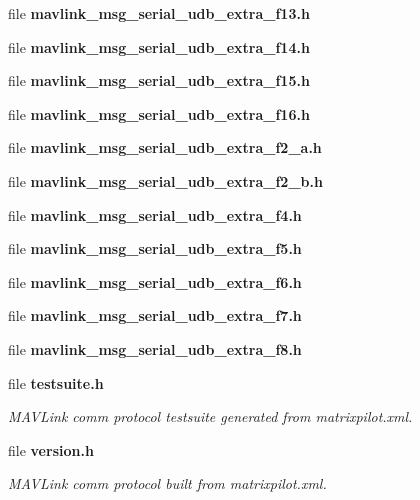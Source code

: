 \begin{DoxyCompactItemize}
file \textbf{ mavlink\+\_\+msg\+\_\+serial\+\_\+udb\+\_\+extra\+\_\+f13.\+h}
\item 
file \textbf{ mavlink\+\_\+msg\+\_\+serial\+\_\+udb\+\_\+extra\+\_\+f14.\+h}
\item 
file \textbf{ mavlink\+\_\+msg\+\_\+serial\+\_\+udb\+\_\+extra\+\_\+f15.\+h}
\item 
file \textbf{ mavlink\+\_\+msg\+\_\+serial\+\_\+udb\+\_\+extra\+\_\+f16.\+h}
\item 
file \textbf{ mavlink\+\_\+msg\+\_\+serial\+\_\+udb\+\_\+extra\+\_\+f2\+\_\+a.\+h}
\item 
file \textbf{ mavlink\+\_\+msg\+\_\+serial\+\_\+udb\+\_\+extra\+\_\+f2\+\_\+b.\+h}
\item 
file \textbf{ mavlink\+\_\+msg\+\_\+serial\+\_\+udb\+\_\+extra\+\_\+f4.\+h}
\item 
file \textbf{ mavlink\+\_\+msg\+\_\+serial\+\_\+udb\+\_\+extra\+\_\+f5.\+h}
\item 
file \textbf{ mavlink\+\_\+msg\+\_\+serial\+\_\+udb\+\_\+extra\+\_\+f6.\+h}
\item 
file \textbf{ mavlink\+\_\+msg\+\_\+serial\+\_\+udb\+\_\+extra\+\_\+f7.\+h}
\item 
file \textbf{ mavlink\+\_\+msg\+\_\+serial\+\_\+udb\+\_\+extra\+\_\+f8.\+h}
\item 
file \textbf{ testsuite.\+h}
\begin{DoxyCompactList}\small\item\em M\+A\+V\+Link comm protocol testsuite generated from matrixpilot.\+xml. \end{DoxyCompactList}\item 
file \textbf{ version.\+h}
\begin{DoxyCompactList}\small\item\em M\+A\+V\+Link comm protocol built from matrixpilot.\+xml. \end{DoxyCompactList}\end{DoxyCompactItemize}
